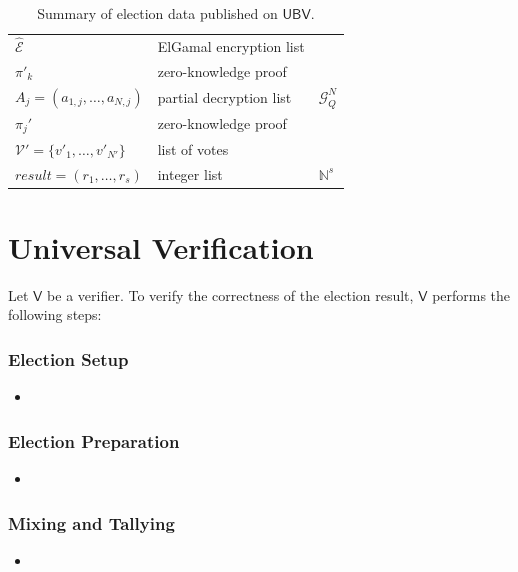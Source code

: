 \documentclass[bibtotoc,halfparskip,oneside]{scrreprt}
\newcommand{\Verifier}{\ensuremath{\mathsf{V}}\xspace}
\newcommand{\UBV}{\ensuremath{\mathsf{UBV}}\xspace}
\begin{document}
\begin{table}[ht]
\begin{center}
\begin{tabular}{l|l|l}
				$\hat{\mathcal{E}}$ & ElGamal encryption list & \\
				$\pi'_{k}$ & zero-knowledge proof & \\
				$A_j= (a_{1,j},\ldots,a_{N,j})$ & partial decryption list & $\mathcal{G}_Q^N$ \\
				$\pi_{j}'$ & zero-knowledge proof & \\ 
				$\mathcal{V}'=\{v'_1,\ldots,v'_{N'}\}$ & list of votes & \\
				$\mathit{result}=(r_1,\ldots,r_s)$ & integer list & $\mathbb{N}^s$\\
			\end{tabular}
			\caption{Summary of election data published on \UBV.}
		\end{center}
	\end{table}
	
	\section{Universal Verification}
	
	Let \Verifier be a verifier. To verify the correctness of the election result, \Verifier performs the following steps:
	
	\subsubsection{Election Setup}
	\begin{itemize}
		\item 
	\end{itemize}
	
	\subsubsection{Election Preparation}
	\begin{itemize}
		\item 
	\end{itemize}
	
	\subsubsection{Mixing and Tallying}
	\begin{itemize}
		\item 
	\end{itemize}
	
\end{document}
